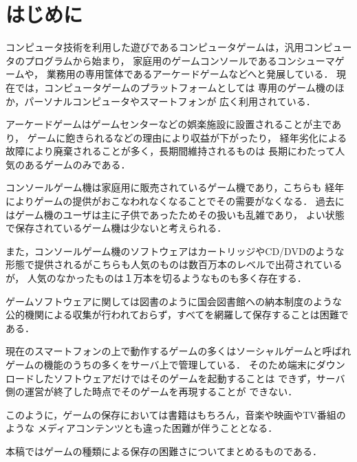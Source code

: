 \section{はじめに}
\label{sec:intro}

コンピュータ技術を利用した遊びであるコンピュータゲームは，汎用コンピュータのプログラムから始まり，
家庭用のゲームコンソールであるコンシューマゲームや，
業務用の専用筐体であるアーケードゲームなどへと発展している．
現在では，コンピュータゲームのプラットフォームとしては
専用のゲーム機のほか，パーソナルコンピュータやスマートフォンが
広く利用されている．

アーケードゲームはゲームセンターなどの娯楽施設に設置されることが主であり，
ゲームに飽きられるなどの理由により収益が下がったり，
経年劣化による故障により廃棄されることが多く，長期間維持されるものは
長期にわたって人気のあるゲームのみである．

コンソールゲーム機は家庭用に販売されているゲーム機であり，こちらも
経年によりゲームの提供がおこなわれなくなることでその需要がなくなる．
過去にはゲーム機のユーザは主に子供であったためその扱いも乱雑であり，
よい状態で保存されているゲーム機は少ないと考えられる．

また，コンソールゲーム機のソフトウェアはカートリッジやCD/DVDのような
形態で提供されるがこちらも人気のものは数百万本のレベルで出荷されているが，
人気のなかったものは１万本を切るようなものも多く存在する．

ゲームソフトウェアに関しては図書のように国会図書館への納本制度のような
公的機関による収集が行われておらず，すべてを網羅して保存することは困難である．

現在のスマートフォンの上で動作するゲームの多くはソーシャルゲームと呼ばれ
ゲームの機能のうちの多くをサーバ上で管理している．
そのため端末にダウンロードしたソフトウェアだけではそのゲームを起動することは
できず，サーバ側の運営が終了した時点でそのゲームを再現することが
できない．

このように，ゲームの保存においては書籍はもちろん，音楽や映画やTV番組のような
メディアコンテンツとも違った困難が伴うこととなる．

本稿ではゲームの種類による保存の困難さについてまとめるものである．